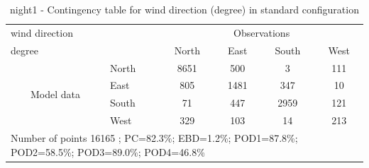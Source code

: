 \begin{table}[p!]
\begin{center}
\begin{tabular}{llcccc}
\hline
{wind direction}                                       &                             &    \multicolumn{4}{c}{Observations}                 \\
{degree}                                       &                             & {North}   & {East} & {South} & {West} \\
\hline
\multicolumn{1}{c}{\multirow{4}{*}{Model data}}  & {North}                    & 8651   & 500    & 3     & 111\\
                                                 & {East}                     & 805   & 1481    & 347     & 10\\
                                                 & {South}                    & 71   & 447   & 2959    & 121\\
                                                 & {West}                     & 329  & 103   & 14    & 213\\
\hline 
\multicolumn{6}{l}{ Number of points        16165 ; PC=82.3\%; EBD=1.2\%; POD1=87.8\%; POD2=58.5\%; POD3=89.0\%; POD4=46.8\%}                 \\
\end{tabular}
\end{center}
\caption{night1 - Contingency table for {wind direction} (degree) in standard configuration}
\label{tab:contingencywdBEF:night1}
\end{table}
